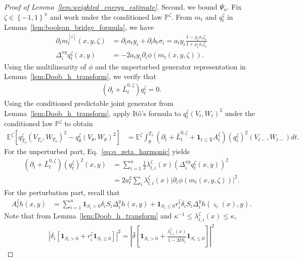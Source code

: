 \documentclass[10pt,a4paper]{amsart}
\newcommand{\Exs}{\ensuremath{{\mathbb{E}}}}
\newcommand{\Prob}{\ensuremath{{\mathbb{P}}}}
\newcommand{\To}{{T_o}}
\newcommand{\abss}[1]{\left| #1 \right |}
\newcommand{\bdelta}{\bar{\delta}}
\newcommand{\braces}[1]{\left\{ #1 \right \}}
\newcommand{\brackets}[1]{\left[ #1 \right]}
\newcommand{\btau}{\kappa}
\newcommand{\flip}{\varsigma}
\newcommand{\jL}{\bar{L}}
\newcommand{\parenth}[1]{\left( #1 \right)}
\newcommand{\stopT}{{\boldsymbol{\mathfrak{T}}}}
\newcommand{\uV}{V}
\newcommand{\uW}{W}
\begin{document}
\begin{proof}[Proof of Lemma~\ref{lem:weighted_energy_estimate}]
  Second, we bound $\Psi_a$. Fix $\zeta \in \braces{-1,1}^n$ and work under the conditioned law $\Prob^\zeta$. From $m_t$ and $q_t^{\zeta}$ in Lemma~\ref{lem:boolean_bridge_formula}, we have
  \begin{align*}
    \partial_t m_t^{[i]}(x, y, \zeta) &= \partial_t a_t y_i + \partial_t b_t \sigma_i = a_t y_i \frac{1-\rho_t x_i \zeta_i}{1+\rho_t x_i \zeta_i} \\
    \Delta_i^{xy} q_t^{\zeta}(x, y) & = - 2 a_t y_i \partial_i \phi(m_t(x, y, \zeta)).
  \end{align*}
  Using the multilinearity of $\phi$ and the unperturbed generator representation in Lemma~\ref{lem:Doob_h_transform}, we verify that
  \begin{align}
    \label{eq:q_zeta_harmonic}
    \parenth{\partial_t + \jL_t^{0, \zeta}} q_t^{\zeta} = 0.
  \end{align}
  Using the conditioned predictable joint generator from
  Lemma~\ref{lem:Doob_h_transform}, apply It\^o's formula to $q_{t}^{\zeta}(\uV_t, \uW_t)^2$ under the conditioned law $\Prob^\zeta$ to obtain
  \begin{align}
    \label{eq:q_zeta_sq_ito}
    \Exs^{\zeta} \brackets{q_{\To}^{\zeta}(\uV_{\To}, \uW_{\To})^2 - q_{\theta}^{\zeta}(\uV_\theta, \uW_\theta)^2} &= \Exs^{\zeta} \int_\theta^{\To} \parenth{\partial_t + \jL_t^{0, \zeta} + \mathbf{1}_{t \leq \stopT} A_t^{\zeta}} \parenth{q_{t}^{\zeta}}^2 (\uV_{t-}, \uW_{t-}) dt.
  \end{align}
  For the unperturbed part, Eq.~\eqref{eq:q_zeta_harmonic} yields
  \begin{align*}
    \parenth{\partial_t + \jL_t^{0, \zeta}} \parenth{q_{t}^{\zeta}}^2 (x, y) &= \sum_{i=1}^n \frac12 \lambda_{t, i}^{\zeta}(x) \parenth{\Delta_i^{xy} q_{t}^{\zeta} (x, y)}^2 \\
    &= 2 a_t^2\sum_{i} \lambda_{t, i}^{\zeta}(x) \abss{\partial_i \phi(m_t(x, y, \zeta))}^2.
  \end{align*}
  For the perturbation part, recall that 
  \begin{align*}
    A_t^\zeta h(x, y) &= \sum_{i=1}^n  \mathbf{1}_{S_i > 0}  \delta_i  S_i \Delta_{i}^y h(x, y)  + \mathbf{1}_{S_i \leq 0} r_{i}^{\zeta} \delta_i  S_i  \Delta_i^y h(\flip_i(x), y).
  \end{align*}
  Note that from Lemma~\ref{lem:Doob_h_transform} and $\btau^{-1} \leq \lambda_{t, i}^{\zeta}(x) \leq \btau$,
  \begin{align*}
    \abss{\delta_i \brackets{\mathbf{1}_{S_i > 0} + r_i^{\zeta} \mathbf{1}_{S_i \leq 0} }}^2 = \abss{\bdelta \brackets{\mathbf{1}_{S_i > 0} + \frac{\lambda_{t, i}^{\zeta}(x)}{1 - 2 \bdelta S_i} \mathbf{1}_{S_i \leq 0}}}^2

\end{align*}
\end{proof}
\end{document}
